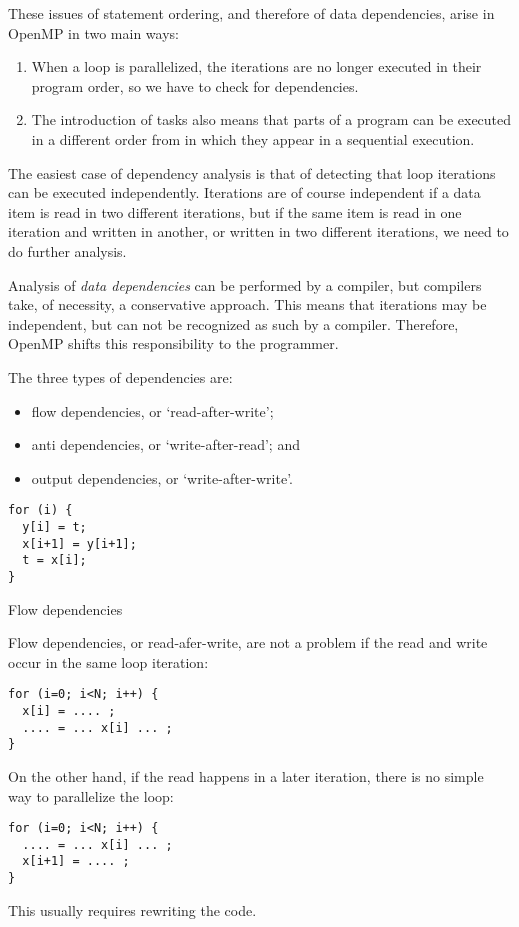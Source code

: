 These issues of statement ordering, and therefore of
data dependencies, arise in OpenMP in two main ways:
\begin{enumerate}
\item When a loop is parallelized, the iterations are no longer
  executed in their program order, so we have to check for dependencies.
\item The introduction of tasks also means that parts of a program
  can be executed in a different order from in which they appear
  in a sequential execution.
\end{enumerate}

The easiest case of dependency analysis is that of
detecting that loop iterations can be executed independently.
Iterations are of course independent if a data item
is read in two different iterations, but if the same
item is read in one iteration and written in another,
or written in two different iterations,
we need to do further analysis.

Analysis of \emph{data dependencies} can be performed
by a compiler, but compilers take, of necessity,
a conservative approach. This means that iterations
may be independent, but can not be recognized as such by
a compiler. Therefore, OpenMP shifts this responsibility
to the programmer.

The three types of dependencies are:
\begin{itemize}
\item flow dependencies, or `read-after-write';
\item anti dependencies, or `write-after-read'; and
\item output dependencies, or `write-after-write'.
\end{itemize}

\begin{verbatim}
for (i) {
  y[i] = t;
  x[i+1] = y[i+1];
  t = x[i];
}
\end{verbatim}

 {Flow dependencies}

Flow dependencies, or read-afer-write,
are not a problem if the read and write occur in the same
loop iteration:
\begin{verbatim}
for (i=0; i<N; i++) {
  x[i] = .... ;
  .... = ... x[i] ... ;
}
\end{verbatim}
On the other hand, if the read happens in a later iteration,
there is no simple way to parallelize the loop:
\begin{verbatim}
for (i=0; i<N; i++) {
  .... = ... x[i] ... ;
  x[i+1] = .... ;
}
\end{verbatim}
This usually requires rewriting the code.

